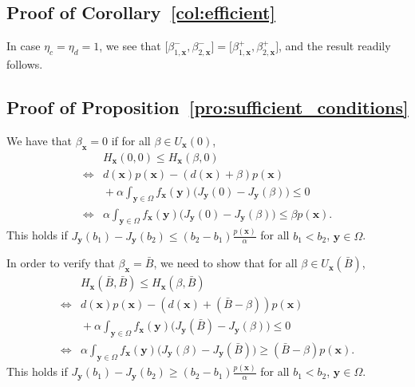 \documentclass[journal]{IEEEtran}
\newcommand{\Bmax}{\bar{B}}
\newcommand{\bfx}{\boldsymbol x}
\newcommand{\bfy}{\boldsymbol y}
\newcommand\1{\mathbf{1}}
\begin{document}
\subsection{Proof of Corollary~\ref{col:efficient}}

\begin{IEEEproof}
In case $\eta_c = \eta_d = 1$, we see that $\lbrack \beta_{1,\bfx}^-,\beta_{2,\bfx}^-\rbrack = \lbrack \beta_{1,\bfx}^+,\beta_{2,\bfx}^+\rbrack$, and the result readily follows.
\end{IEEEproof}

\subsection{Proof of Proposition~\ref{pro:sufficient_conditions}}\label{sec:proof_sufficient}

\begin{IEEEproof}
We have that $\beta_{\bfx} = 0$ if for all $\beta \in U_{\bfx}(0)$,
\begin{align*}
&H_{\bfx}(0,0) \le H_{\bfx}(\beta,0)\\
\Leftrightarrow{}& d(\bfx) p(\bfx) - (d(\bfx) + \beta) p(\bfx)\\
&{}+ \alpha \int_{\bfy \in \Omega} f_{\bfx}(\bfy)\big( J_{\bfy}(0) - J_{\bfy}(\beta)\big) \le 0\\
\Leftrightarrow{}& \alpha \int_{\bfy \in \Omega} f_{\bfx}(\bfy)\big( J_{\bfy}(0) - J_{\bfy}(\beta)\big) \le \beta p(\bfx).
\end{align*}
This holds if $J_{\bfy}(b_1) - J_{\bfy}(b_2) \le (b_2 - b_1) \frac{p(\bfx)}{\alpha}$ for all $b_1 < b_2$, $\bfy \in \Omega$.

In order to verify that $\beta_{\bfx} = \Bmax$, we need to show that for all $\beta \in U_{\bfx}(\Bmax)$,
\begin{align*}
&H_{\bfx}(\Bmax,\Bmax) \le H_{\bfx}(\beta,\Bmax)\\
\Leftrightarrow{}& d(\bfx) p(\bfx) - (d(\bfx) + (\Bmax - \beta)) p(\bfx)\\
 &{}+ \alpha \int_{\bfy \in \Omega} f_{\bfx}(\bfy)\big( J_{\bfy}(\Bmax) - J_{\bfy}(\beta)\big) \le 0\\
\Leftrightarrow{}& \alpha \int_{\bfy \in \Omega} f_{\bfx}(\bfy)\big( J_{\bfy}(\beta) - J_{\bfy}(\Bmax)\big) \ge (\Bmax - \beta) p(\bfx).
\end{align*}
This holds if $J_{\bfy}(b_1) - J_{\bfy}(b_2) \ge (b_2 - b_1) \frac{p(\bfx)}{\alpha}$ for all $b_1 < b_2$, $\bfy \in \Omega$.
\end{IEEEproof}
\end{document}
